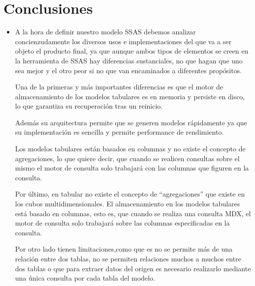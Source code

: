 \documentclass[twoside,twocolumn]{article}
\begin{document}
\section{Conclusiones}
\begin{itemize}	
 \item A la hora de definir nuestro modelo SSAS debemos analizar concienzudamente los diversos usos e implementaciones del que va a ser objeto el producto final, ya que aunque ambos tipos de elementos se creen en la herramienta de SSAS hay diferencias sustanciales, no que hagan que uno sea mejor y el otro peor si no que van encaminados a diferentes propósitos.

Una de la primeras y más importantes diferencias es que el motor de almacenamiento de los modelos tabulares es en memoria y persiste en disco, lo que garantiza su recuperación tras un reinicio.

Además su arquitectura permite que se generen modelos rápidamente ya que su implementación es sencilla y permite performance de rendimiento.

Los modelos tabulares están basados en columnas y no existe el concepto de agregaciones, lo que quiere decir, que cuando se realicen consultas sobre el mismo el motor de consulta solo trabajará con las columnas que figuren en la consulta.

Por último, en tabular no existe el concepto de “agregaciones” que existe en los cubos multidimensionales. El almacenamiento en los modelos tabulares está basado en columnas, esto es, que cuando se realiza una consulta MDX, el motor de consulta solo trabajará sobre las columnas especificadas en la consulta.

Por otro lado tienen limitaciones,como que es no se permite más de una relación entre dos tablas, no se permiten relaciones muchos a muchos entre dos tablas o que para extraer datos del origen es necesario realizarlo mediante una única consulta por cada tabla del modelo.
\\


\end{itemize} 



\end{document}
